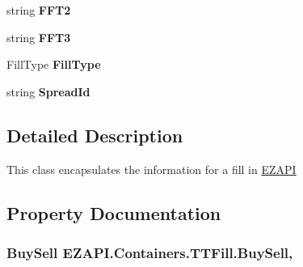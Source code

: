 \begin{DoxyCompactItemize}
\item 
\hypertarget{class_e_z_a_p_i_1_1_containers_1_1_t_t_fill_a57110693e3f10923179adca88fc109bc}{string {\bfseries F\-F\-T2}}\label{class_e_z_a_p_i_1_1_containers_1_1_t_t_fill_a57110693e3f10923179adca88fc109bc}

\item 
\hypertarget{class_e_z_a_p_i_1_1_containers_1_1_t_t_fill_a39e38611382f24299289fabde5a11877}{string {\bfseries F\-F\-T3}}\label{class_e_z_a_p_i_1_1_containers_1_1_t_t_fill_a39e38611382f24299289fabde5a11877}

\item 
\hypertarget{class_e_z_a_p_i_1_1_containers_1_1_t_t_fill_ae5c709ab282b33372215c69da805fa26}{Fill\-Type {\bfseries Fill\-Type}}\label{class_e_z_a_p_i_1_1_containers_1_1_t_t_fill_ae5c709ab282b33372215c69da805fa26}

\item 
\hypertarget{class_e_z_a_p_i_1_1_containers_1_1_t_t_fill_a8b86034761b6973594f916aa39e535a1}{string {\bfseries Spread\-Id}}\label{class_e_z_a_p_i_1_1_containers_1_1_t_t_fill_a8b86034761b6973594f916aa39e535a1}

\end{DoxyCompactItemize}


\subsection{Detailed Description}
This class encapsulates the information for a fill in \hyperlink{namespace_e_z_a_p_i}{E\-Z\-A\-P\-I} 



\subsection{Property Documentation}
\hypertarget{class_e_z_a_p_i_1_1_containers_1_1_t_t_fill_a00b0834ed7a3024f196ebaae2c9ec778}{
\subsubsection[{Buy\-Sell}]{\setlength{\rightskip}{0pt plus 5cm}Buy\-Sell E\-Z\-A\-P\-I.\-Containers.\-T\-T\-Fill.\-Buy\-Sell\hspace{0.3cm}{\ttfamily [get]}, {\ttfamily [set]}}}\label{class_e_z_a_p_i_1_1_containers_1_1_t_t_fill_a00b0834ed7a3024f196ebaae2c9ec778}


